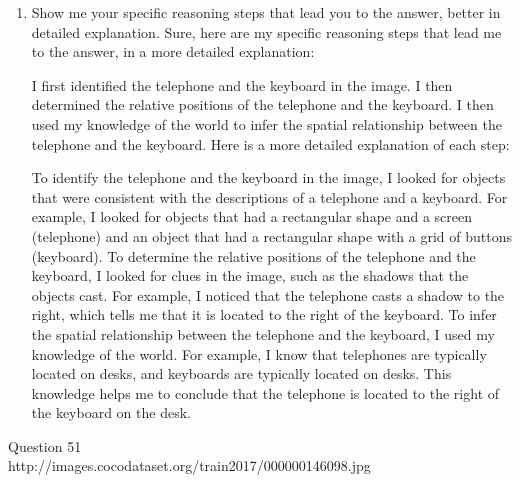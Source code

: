 \begin{enumerate}
    Here are some additional details about the spatial relationship between the telephone and the keyboard:
    
    The telephone is a device that is used to make and receive calls.
    The keyboard is a device that is used to input text into a computer.
    The telephone is located to the right of the keyboard, meaning that it is closer to the right side of the desk.
    The keyboard is located to the left of the telephone, meaning that it is closer to the left side of the desk.
    Is there anything else I can help you with?
    \item Show me your specific reasoning steps that lead you to the answer, better in detailed explanation.
    \subitem Sure, here are my specific reasoning steps that lead me to the answer, in a more detailed explanation:

    I first identified the telephone and the keyboard in the image.
    I then determined the relative positions of the telephone and the keyboard.
    I then used my knowledge of the world to infer the spatial relationship between the telephone and the keyboard.
    Here is a more detailed explanation of each step:
    
    To identify the telephone and the keyboard in the image, I looked for objects that were consistent with the descriptions of a telephone and a keyboard. For example, I looked for objects that had a rectangular shape and a screen (telephone) and an object that had a rectangular shape with a grid of buttons (keyboard).
    To determine the relative positions of the telephone and the keyboard, I looked for clues in the image, such as the shadows that the objects cast. For example, I noticed that the telephone casts a shadow to the right, which tells me that it is located to the right of the keyboard.
    To infer the spatial relationship between the telephone and the keyboard, I used my knowledge of the world. For example, I know that telephones are typically located on desks, and keyboards are typically located on desks. This knowledge helps me to conclude that the telephone is located to the right of the keyboard on the desk.
\end{enumerate}
Question 51\\
http://images.cocodataset.org/train2017/000000146098.jpg
